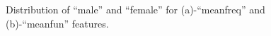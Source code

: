 \begin{figure}[htb]
	\hfill%
	\hfill%
	\hfill\null%
	\caption{Distribution of ``male'' and ``female'' for (a)-``meanfreq'' and (b)-``meanfun'' features.}
	\label{fig_facet}
\end{figure}

